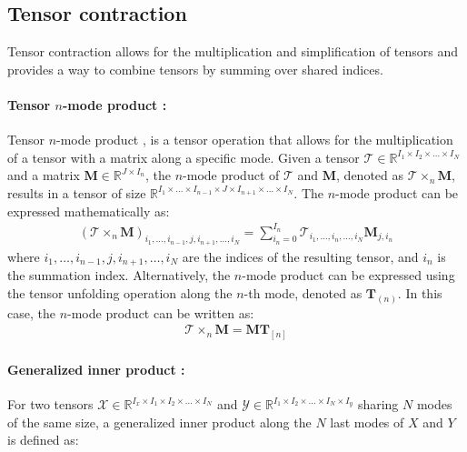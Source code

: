 \documentclass{article}
\begin{document}
\subsection{Tensor contraction}
\label{subsec:tensor-contraction}

Tensor contraction allows for the multiplication and simplification of tensors and provides a way to combine tensors by summing over shared indices.

\paragraph{Tensor $n$-mode product : }
Tensor $n$-mode product \cite{r4} , is a tensor operation that allows for the multiplication of a tensor with a matrix along a specific mode.
Given a tensor $\mathcal{T} \in \mathbb{R}^{I_1 \times I_2 \times \dots \times I_N}$ and a matrix $\mathbf{M} \in \mathbb{R}^{J \times I_n}$, the $n$-mode product of $\mathcal{T}$ and $\mathbf{M}$, denoted as $\mathcal{T} \times_n \mathbf{M}$, results in a tensor of size $\mathbb{R}^{I_1 \times \dots \times I_{n-1} \times J \times I_{n+1} \times \dots \times I_N}$. The $n$-mode product can be expressed mathematically as:
\begin{align}
	\label{eq:contraction}
	(\mathcal{T} \times_n \mathbf{M})_{i_1, \ldots, i_{n-1}, j, i_{n+1}, \ldots, i_N} = \sum_{i_n=0}^{I_n} \mathcal{T}_{i_1, \ldots, i_n, \ldots, i_N} \mathbf{M}_{j, i_n}
\end{align}
where $i_1, \dots, i_{n-1}, j, i_{n+1}, \dots, i_N$ are the indices of the resulting tensor, and $i_n$ is the summation index. Alternatively, the $n$-mode product can be expressed using the tensor unfolding operation along the $n$-th mode, denoted as $\mathbf{T}_{(n)}$. In this case, the $n$-mode product can be written as:
\begin{align}
	\label{eq:contraction2}
	\mathcal{T} \times_n \mathbf{M} = \mathbf{M} \mathbf{T}_{[n]}
\end{align}

\paragraph{Generalized inner product : }
For two tensors $\mathcal{X} \in \mathbb{R}^{I_x \times I_1 \times I_2 \times \dots \times I_N}$ and $\mathcal{Y} \in \mathbb{R}^{I_1 \times I_2 \times \dots \times I_N \times I_y}$ sharing $N$ modes of the same size, a generalized inner product \cite{r4} along the $N$ last modes of $X$ and $Y$ is defined as:
\end{document}
